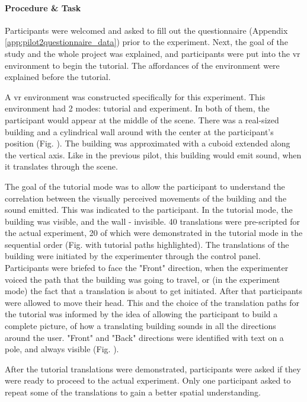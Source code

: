 \paragraph{Procedure \& Task}
Participants were welcomed and asked to fill out the questionnaire (Appendix \ref{app:pilot2questionnaire_data}) prior to the experiment. Next, the goal of the study and the whole project was explained, and participants were put into the \gls{vr} environment to begin the tutorial. The affordances of the environment were explained before the tutorial. 

A \gls{vr} environment was constructed specifically for this experiment. This environment had 2 modes: tutorial and experiment. In both of them, the participant would appear at the middle of the scene. There was a real-sized building and a cylindrical wall around with the center at the participant's position (Fig. ). The building was approximated with a cuboid extended along the vertical axis. Like in the previous pilot, this building would emit sound, when it translates through the scene.

The goal of the tutorial mode was to allow the participant to understand the correlation between the visually perceived movements of the building and the sound emitted. This was indicated to the participant. In the tutorial mode, the building was visible, and the wall - invisible.
40 translations were pre-scripted for the actual experiment, 20 of which were demonstrated in the tutorial mode in the sequential order (Fig. with tutorial paths highlighted). The translations of the building were initiated by the experimenter through the control panel. Participants were briefed to face the "Front" direction, when the experimenter voiced the path that the building was going to travel, or (in the experiment mode) the fact that a translation is about to get initiated. After that participants were allowed to move their head. This and the choice of the translation paths for the tutorial was informed by the idea of allowing the participant to build a complete picture, of how a translating building sounds in all the directions around the user. "Front" and "Back" directions were identified with text on a pole, and always visible (Fig. ).

After the tutorial translations were demonstrated, participants were asked if they were ready to proceed to the actual experiment. Only one participant asked to repeat some of the translations to gain a better spatial understanding.

